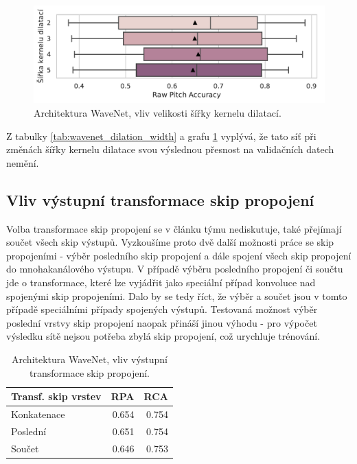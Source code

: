 \begin{figure}[h]\centering
    \includegraphics[scale=0.6]{../img/figures/wavenet_dilation_width.pdf}
\caption{Architektura WaveNet, vliv velikosti šířky kernelu dilatací.}\label{obr:wavenet_dilation_width}
\end{figure}

Z tabulky \ref{tab:wavenet_dilation_width} a grafu \ref{obr:wavenet_dilation_width} vyplývá, že tato síť při změnách šířky kernelu dilatace svou výslednou přesnost na validačních datech nemění.

\subsection{Vliv výstupní transformace skip propojení}

Volba transformace skip propojení se v článku týmu \cite{Oord2016} nediskutuje, \cite{Martak2018} také přejímají součet všech skip výstupů. Vyzkoušíme proto dvě další možnosti práce se skip propojeními - výběr posledního skip propojení a dále spojení všech skip propojení do mnohakanálového výstupu. V případě výběru posledního propojení či součtu jde o transformace, které lze vyjádřit jako speciální případ konvoluce nad spojenými skip propojeními. Dalo by se tedy říct, že výběr a součet jsou v tomto případě speciálními případy spojených výstupů. Testovaná možnost výběr poslední vrstvy skip propojení naopak přináší jinou výhodu - pro výpočet výsledku sítě nejsou potřeba zbylá skip propojení, což urychluje trénování.

\begin{table}[h!]
\centering
    \begin{tabular}{lrr}
    \toprule
    Transf. skip vrstev &   RPA &   RCA \\
    \midrule
            Konkatenace & 0.654 & 0.754 \\
            Poslední & 0.651 & 0.754 \\
                Součet & 0.646 & 0.753 \\
    \bottomrule
    \end{tabular}

\caption{Architektura WaveNet, vliv výstupní transformace skip propojení.}\label{tab:wavenet_skip_reduction}
\end{table}

